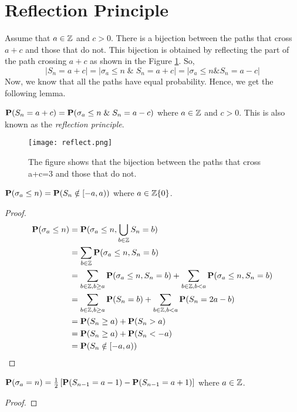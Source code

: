 \documentclass[main]{subfiles}
\begin{document}
\section{Reflection Principle}
Assume that $a \in \Z$ and $c>0$. There is a bijection between the paths that cross $a+c$ and those that do not. This bijection is obtained by reflecting the part of the path crossing $a+c$ as shown in the Figure \ref{fig:reflect}. So,
$$\left|S_n=a+c\right|=\left|\sigma_a\leq n \; \& \; S_n=a+c \right|=\left|\sigma_a\leq n \& S_n=a-c \right|$$
Now, we know that all the paths have equal probability. Hence, we get the following lemma.
\begin{lemma}
    $\P(S_n=a+c)=\P(\sigma_a\leq n \; \& \; S_n=a-c)$ where $a \in \Z$ and $c>0$. This is also known as the \emph{reflection principle}.
    \label{lem:reflect}
\end{lemma}
\begin{figure}[ht]
    \label{fig:reflect}
    \centering
    \texttt{[image: reflect.png]}
    \caption{The figure shows that the bijection between the paths that cross a+c=3 and those that do not.}
\end{figure}
\begin{theorem}
    $\P(\sigma_a\leq n)=\P(S_n\notin [-a,a))$ where $a \in \Z \\ \{0\}$.
\end{theorem}
\begin{proof}
    $$
        \begin{aligned}
            \P(\sigma_a\leq n) & =\P(\sigma_a\leq n, \bigcup_{b \in \Z}{S_n=b} )                                                      \\
                               & =\sum_{b \in \Z} \P(\sigma_a\leq n, S_n=b)                                                           \\
                               & =\sum_{b \in \Z, b\geq a} \P(\sigma_a\leq n, S_n=b)+ \sum_{b \in \Z, b< a} \P(\sigma_a\leq n, S_n=b) \\
                               & =\sum_{b \in \Z, b\geq a} \P(S_n=b)+ \sum_{b \in \Z, b< a} \P(S_n=2a-b)                              \\
                               & =\P(S_n\geq a) + \P(S_n >a)                                                                          \\
                               & =\P(S_n\geq a) + \P(S_n <-a)                                                                         \\
                               & =\P(S_n\notin [-a,a))
        \end{aligned}
    $$
\end{proof}
\begin{corollary}
    $\P(\sigma_a=n)=\frac{1}{2}\left[\P(S_{n-1}=a-1)-\P(S_{n-1}=a+1)\right]$ where $a \in \Z$.
\end{corollary}
\begin{proof}

\end{proof}
\end{document}
